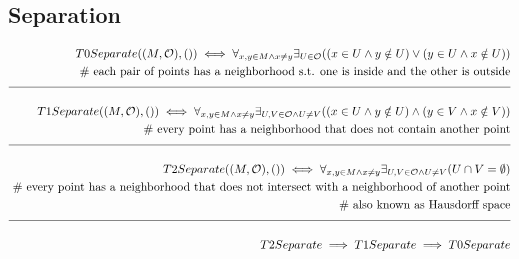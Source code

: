 \documentclass[a4paper]{article}
\newcommand{\eqComment}[1]{\text{  \# #1}}
\newcommand{\n}{\\[1.5ex] \hline \nonumber \\[0ex]}
\newcommand{\m}{\nonumber \\}
\begin{document}
\subsection{Separation}
\begin{tcolorbox}
\begin{align}
   T0Separate((M, \mathcal{O}), ()) \iff \forall_{x, y \in M \land x \neq y} \exists_{U \in \mathcal{O}} ((x \in U \land y \notin U) \lor (y \in U \land x \notin U))
\m \eqComment{each pair of points has a neighborhood s.t. one is inside and the other is outside}
\n T1Separate((M, \mathcal{O}), ()) \iff \forall_{x, y \in M \land x \neq y} \exists_{U, V \in \mathcal{O} \land U \neq V} ((x \in U \land y \notin U) \land (y \in V \land x \notin V))
\m \eqComment{every point has a neighborhood that does not contain another point}
\n T2Separate((M, \mathcal{O}), ()) \iff \forall_{x, y \in M \land x \neq y} \exists_{U, V \in \mathcal{O} \land U \neq V} (U \cap V = \emptyset)
\m \eqComment{every point has a neighborhood that does not intersect with a neighborhood of another point}
\m \eqComment{also known as Hausdorff space}
\n T2Separate \implies T1Separate \implies T0Separate
\end {align}
\end{tcolorbox}
\end{document}
